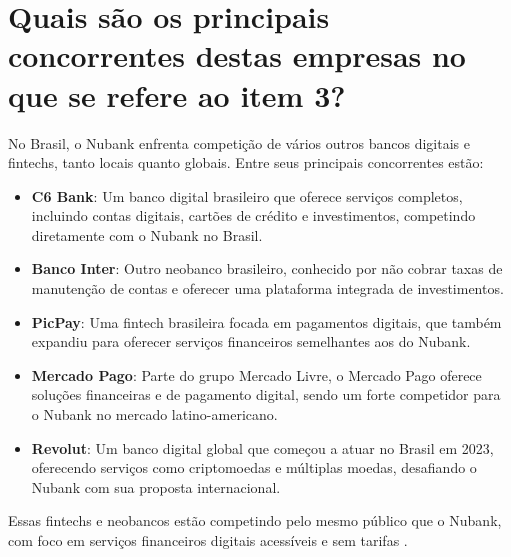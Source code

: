 \section{Quais são os principais concorrentes destas empresas no que se refere ao item 3?}

No Brasil, o Nubank enfrenta competição de vários outros bancos digitais e fintechs, tanto locais quanto globais. Entre seus principais concorrentes estão:

\begin{itemize}
    \item \textbf{C6 Bank}: Um banco digital brasileiro que oferece serviços completos, incluindo contas digitais, cartões de crédito e investimentos, competindo diretamente com o Nubank no Brasil.
    \item \textbf{Banco Inter}: Outro neobanco brasileiro, conhecido por não cobrar taxas de manutenção de contas e oferecer uma plataforma integrada de investimentos.
    \item \textbf{PicPay}: Uma fintech brasileira focada em pagamentos digitais, que também expandiu para oferecer serviços financeiros semelhantes aos do Nubank.
    \item \textbf{Mercado Pago}: Parte do grupo Mercado Livre, o Mercado Pago oferece soluções financeiras e de pagamento digital, sendo um forte competidor para o Nubank no mercado latino-americano.
    \item \textbf{Revolut}: Um banco digital global que começou a atuar no Brasil em 2023, oferecendo serviços como criptomoedas e múltiplas moedas, desafiando o Nubank com sua proposta internacional.
\end{itemize}

Essas fintechs e neobancos estão competindo pelo mesmo público que o Nubank, com foco em serviços financeiros digitais acessíveis e sem tarifas \cite{infomoney2024}.
